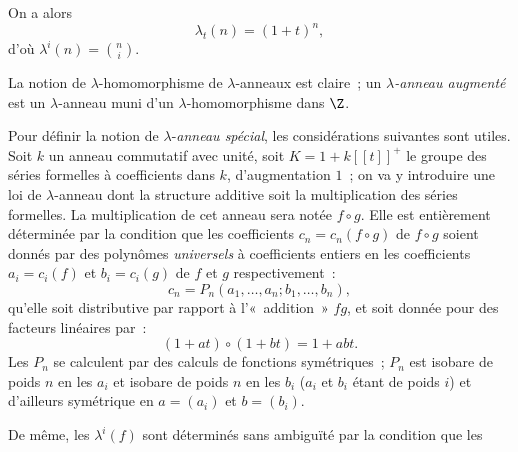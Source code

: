 On a alors
\begin{equation}\tag{1.5}
\lambda_t(n)=(1+t)^n,
\end{equation}
d'où $\lambda^i(n)=\binom{n}{i}$.

La
notion de $\lambda$-homomorphisme de $\lambda$-anneaux est claire~; un \emph{$\lambda$-anneau augmenté} est un $\lambda$-anneau muni d'un $\lambda$-homomorphisme dans $\Z$.

Pour définir la notion de $\lambda$-\emph{anneau spécial}, les considérations suivantes sont utiles. Soit $k$ un anneau commutatif avec unité, soit $K=1+k[[t]]^+$ le groupe des séries formelles à coefficients dans $k$, d'augmentation $1$~; on va y introduire une loi de $\lambda$-anneau dont la structure additive soit la multiplication des séries formelles. La multiplication de cet anneau sera notée $f\circ g$. Elle est entièrement déterminée par la condition que les coefficients $c_n=c_n(f\circ g)$ de $f\circ g$ soient donnés par des polynômes \emph{universels} à coefficients entiers en les coefficients $a_i=c_i(f)$ et $b_i=c_i(g)$ de $f$ et $g$ respectivement~:
\begin{equation}\tag{1.6}
c_n=P_n(a_1,\ldots,a_n;b_1,\ldots,b_n),
\end{equation}
qu'elle soit distributive par rapport à l'«~addition~» $fg$, et soit donnée pour des facteurs linéaires par~:
\begin{equation}\tag{1.7}
(1+at)\circ(1+bt)=1+abt.
\end{equation}
Les $P_n$ se calculent par des calculs de fonctions symétriques~; $P_n$ est isobare de poids $n$ en les $a_i$ et isobare de poids $n$ en les $b_i$ ($a_i$ et $b_i$ étant de poids $i$) et d'ailleurs symétrique en $a=(a_i)$ et $b=(b_i)$.

De même, les $\lambda^i(f)$ sont déterminés sans ambiguïté par la condition que les
